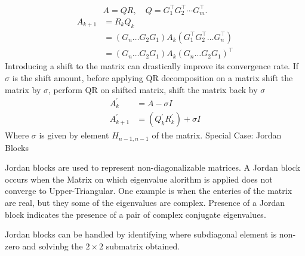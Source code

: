 \documentclass[journal]{IEEEtran}
\begin{document}
\begin{align}
A = Q R, \quad Q = G_1^{\top} G_2^{\top} \cdots G_m^{\top}.
\end{align}
\begin{align}
    A_{k+1}&= R_k Q_k\\
    &=(G_n \dots G_2 G_1)A_k(G_1^{\top}G_2^{\top}\dots G_n^{\top})\\
    &= (G_n \dots G_2 G_1)A_k(G_n \dots G_2 G_1)^{\top}
\end{align}
Introducing a shift to the matrix can drastically improve its convergence rate. If $\sigma$ is the shift amount, before applying QR decomposition on a matrix shift the matrix by $\sigma$, perform QR on shifted matrix, shift the matrix back by $\sigma$
\begin{align}
    A^{\prime}_k &= A-\sigma I\\
    A^{\prime}_{k+1} &= (Q_k^{\prime}R_k^{\prime})+\sigma I
\end{align}
Where $\sigma$ is given by element $H_{n-1, n-1} $ of the matrix. \newline
Special Case: Jordan Blocks \newline

Jordan blocks are used to represent non-diagonalizable matrices. A Jordan block occurs when the Matrix on which eigenvalue alorithm is applied does not converge to Upper-Triangular. One example is when the enteries of the matrix are real, but they some of the eigenvalues are complex. Presence of a Jordan block indicates the presence of a pair of complex conjugate eigenvalues. 
\begin{center}
\end{center}
Jordan blocks can be handled by identifying where subdiagonal element is non-zero and solvinbg the $2 \times 2$ submatrix obtained.
\end{document}
